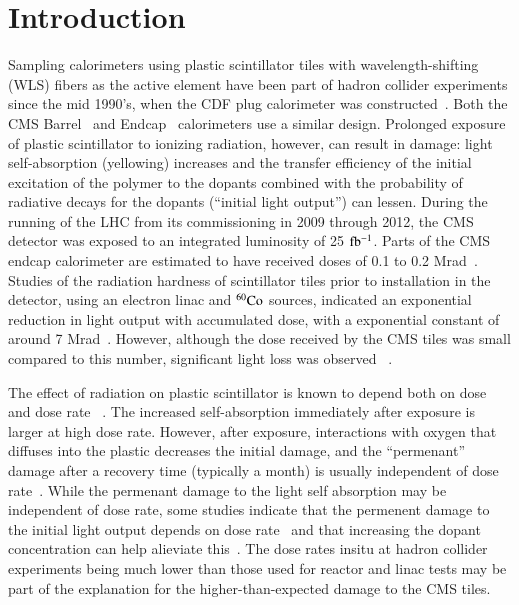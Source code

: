 \documentclass[review]{elsarticle}
\begin{document}
\section{Introduction}
Sampling calorimeters using plastic scintillator tiles
with wavelength-shifting (WLS) fibers as the active element
have been part of hadron
collider experiments since the mid 1990's, when the CDF plug
calorimeter was constructed~\cite{Aota1995557}.  Both the CMS
Barrel~\cite{CMSHB} and Endcap~\cite{HCALTDR1997} calorimeters use a similar design.
Prolonged exposure of plastic scintillator to
ionizing radiation, however, can result in damage:
light self-absorption (yellowing) increases and
the transfer efficiency of the initial excitation of the polymer to the
dopants combined with the probability of radiative decays for the dopants (``initial light output'') can lessen.  
During the running of the LHC from its commissioning in 2009
through 2012, the CMS
detector was exposed to an integrated luminosity of 25 ${\rm fb^{-1}}$.  Parts of the
CMS endcap calorimeter are estimated to have received doses of 0.1 to 0.2 Mrad~\cite{ecfa2015}.
Studies of the radiation hardness of scintillator tiles
prior to installation in the detector,
using an electron linac and ${\rm ^{60}Co}$ sources,
indicated an exponential reduction in 
light output with accumulated dose, with a exponential constant of 
around 7 Mrad~\cite{vasken,ByonWagner1993263}.  
However, although the dose received by the CMS tiles was
small compared to this number,
significant light loss was observed ~\cite{phaseiitdr}.


The effect of radiation on plastic scintillator is known to depend
both on dose and dose rate ~\cite{sauli,34504,Wick1991472,289295,173180,173178,Giokaris1993315}.  The increased self-absorption immediately after exposure is larger at high dose rate. However, after exposure, interactions 
with oxygen that diffuses into
the plastic decreases the initial damage, and the ``permenant'' damage after
a recovery time (typically a month) is usually independent of dose rate~\cite{sauli}.  
While the permenant damage to the light self absorption may be
independent of dose rate, some studies indicate that the 
permenent damage to the initial light output depends
on dose rate~\cite{Biagtan1996125} and that increasing the dopant concentration
can help alieviate this~\cite{zorn3,sauli}.  The dose rates 
insitu at hadron collider experiments being much lower than those
used for reactor and linac tests may be part of the explanation
for the higher-than-expected damage to the CMS tiles.
\end{document}
